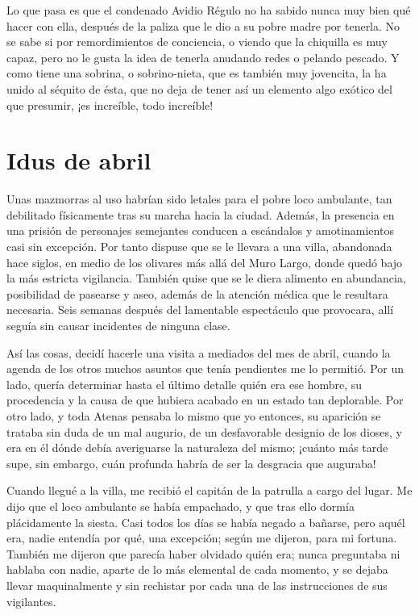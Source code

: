 \documentclass[11pt,openany]{book}
\begin{document}
Lo que pasa es que el condenado Avidio Régulo no ha sabido nunca muy bien qué hacer con ella, después de la paliza que le dio a su pobre madre por tenerla. No se sabe si por remordimientos de conciencia, o viendo que la chiquilla es muy capaz, pero no le gusta la idea de tenerla anudando redes o pelando pescado. Y como tiene una sobrina, o sobrino-nieta, que es también muy jovencita, la ha unido al séquito de ésta, que no deja de tener así un elemento algo exótico del que presumir, ¡es increíble, todo increíble! 


\chapter{Idus de abril} 
Unas mazmorras al uso habrían sido letales para el pobre loco ambulante, tan debilitado físicamente tras su marcha hacia la ciudad. Además, la presencia en una prisión de personajes semejantes conducen a escándalos y amotinamientos casi sin excepción. Por tanto dispuse que se le llevara a una villa, abandonada hace siglos, en medio de los olivares más allá del Muro Largo, donde quedó bajo la más estricta vigilancia. También quise que se le diera alimento en abundancia, posibilidad de pasearse y aseo, además de la atención médica que le resultara necesaria. Seis semanas después del lamentable espectáculo que provocara, allí seguía sin causar incidentes de ninguna clase. 

Así las cosas, decidí hacerle una visita a mediados del mes de abril, cuando la agenda de los otros muchos asuntos que tenía pendientes me lo permitió. Por un lado, quería determinar hasta el último detalle quién era ese hombre, su procedencia y la causa de que hubiera acabado en un estado tan deplorable. Por otro lado, y toda Atenas pensaba lo mismo que yo entonces, su aparición se trataba sin duda de un mal augurio, de un desfavorable designio de los dioses, y era en él dónde debía averiguarse la naturaleza del mismo; ¡cuánto más tarde supe, sin embargo, cuán profunda habría de ser la desgracia que auguraba!  

Cuando llegué a la villa, me recibió el capitán de la patrulla a cargo del lugar. Me dijo que el loco ambulante se había empachado, y que tras ello dormía plácidamente la siesta. Casi todos los días se había negado a bañarse, pero aquél era, nadie entendía por qué, una excepción; según me dijeron, para mi fortuna. También me dijeron que parecía haber olvidado quién era; nunca preguntaba ni hablaba con nadie, aparte de lo más elemental de cada momento, y se dejaba llevar maquinalmente y sin rechistar por cada una de las instrucciones de sus vigilantes.  
\end{document}
